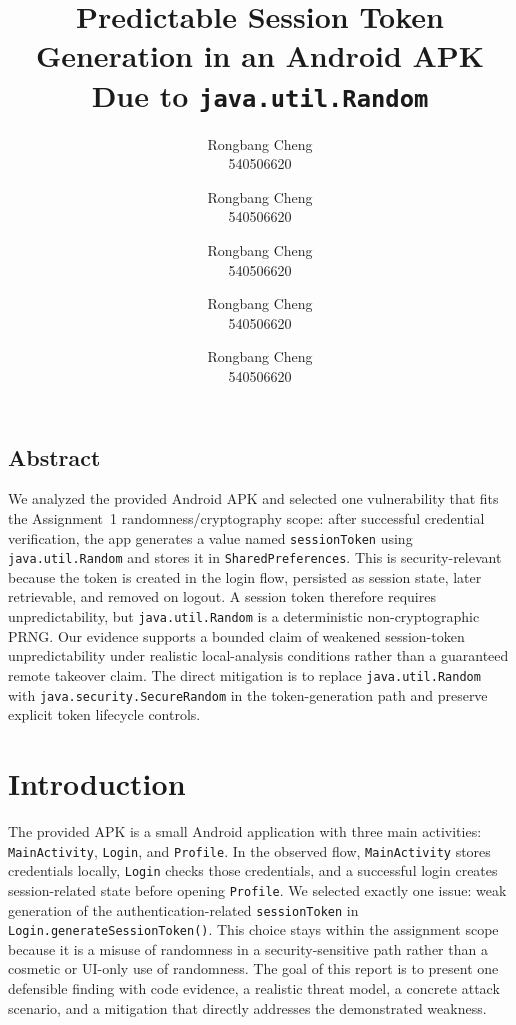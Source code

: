 \documentclass[letterpaper,twocolumn,10pt]{article}
\begin{document}
\date{}

\title{\Large \bf Predictable Session Token Generation in an Android APK Due to \texttt{java.util.Random}}

\author{
{\rm Rongbang Cheng}\\
540506620
\and
{\rm Rongbang Cheng}\\
540506620
\and
{\rm Rongbang Cheng}\\
540506620
\and
{\rm Rongbang Cheng}\\
540506620
\and
{\rm Rongbang Cheng}\\
540506620
}

\maketitle
\thispagestyle{empty}

\subsection*{Abstract}
We analyzed the provided Android APK and selected one vulnerability that fits the Assignment~1 randomness/cryptography scope: after successful credential verification, the app generates a value named \texttt{sessionToken} using \texttt{java.util.Random} and stores it in \texttt{SharedPreferences}. This is security-relevant because the token is created in the login flow, persisted as session state, later retrievable, and removed on logout. A session token therefore requires unpredictability, but \texttt{java.util.Random} is a deterministic non-cryptographic PRNG. Our evidence supports a bounded claim of weakened session-token unpredictability under realistic local-analysis conditions rather than a guaranteed remote takeover claim. The direct mitigation is to replace \texttt{java.util.Random} with \texttt{java.security.SecureRandom} in the token-generation path and preserve explicit token lifecycle controls.

\section{Introduction}
The provided APK is a small Android application with three main activities: \texttt{MainActivity}, \texttt{Login}, and \texttt{Profile}. In the observed flow, \texttt{MainActivity} stores credentials locally, \texttt{Login} checks those credentials, and a successful login creates session-related state before opening \texttt{Profile}. We selected exactly one issue: weak generation of the authentication-related \texttt{sessionToken} in \texttt{Login.generateSessionToken()}. This choice stays within the assignment scope because it is a misuse of randomness in a security-sensitive path rather than a cosmetic or UI-only use of randomness. The goal of this report is to present one defensible finding with code evidence, a realistic threat model, a concrete attack scenario, and a mitigation that directly addresses the demonstrated weakness.
\end{document}
